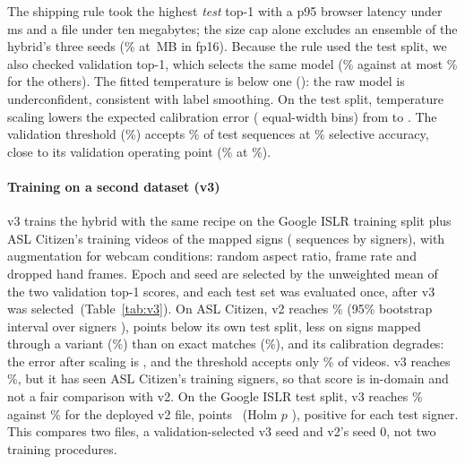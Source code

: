The shipping rule took the highest \emph{test} top-1 with a p95 browser latency under
 ms and a file under ten megabytes; the size cap alone excludes an ensemble of the
hybrid's three seeds (\% at \,MB in fp16). Because the rule used the
test split, we also checked validation top-1, which selects the same model (\% against
at most \% for the others). The fitted temperature is below one (): the raw
model is underconfident, consistent with label smoothing. On the test split, temperature scaling
lowers the expected calibration error ( equal-width bins) from 
 to  . The validation threshold
(\%) accepts \% of test sequences at \% selective
accuracy, close to its validation operating point (\% at \%).

\paragraph*{Training on a second dataset (v3)}
v3 trains the hybrid with the same recipe on the Google ISLR training split plus ASL Citizen's
training videos of the mapped signs ( sequences by  signers), with
augmentation for webcam conditions: random aspect ratio, frame rate and dropped hand frames. Epoch
and seed are selected by the unweighted mean of the two validation top-1 scores, and each test set
was evaluated once, after v3 was selected\ifwithvthree\ (Table~\ref{tab:v3})\fi. On ASL Citizen,
v2 reaches \% (95\% bootstrap interval over signers ),
 points below its own test split, less on signs mapped through a variant
(\%) than on exact matches (\%), and its calibration degrades: the error after scaling is , and
the threshold accepts only \% of videos. v3 reaches \%, but it has
seen ASL Citizen's training signers, so that score is in-domain and not a fair comparison with v2.
On the Google ISLR test split, v3 reaches \% against \% for the deployed
v2 file,  points\ifwithvthree\else\  (Holm $p$ )\fi,
positive for each test signer. This compares two files, a
validation-selected v3 seed and v2's seed 0, not two training procedures.

\ifwithvthree\fi
